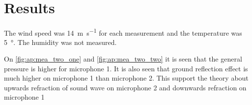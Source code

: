 \section*{Results}

The wind speed was \SI{14}{\meter\per\second} for each measurement and the temperature was \SI{5}{\degree}. The humidity was not measured. 


On \autoref{fig:ap:mea_two_one} and \autoref{fig:ap:mea_two_two} it is seen that the general pressure is higher for microphone 1. It is also seen that ground reflection effect is much higher on microphone 1 than microphone 2. This support the theory about upwards refraction of sound wave on microphone 2 and downwards refraction on microphone 1 



